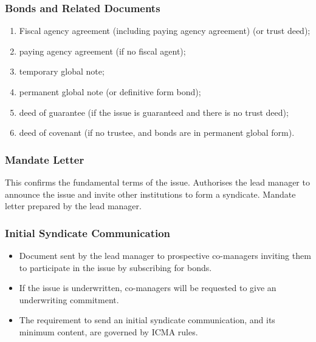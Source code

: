 \documentclass[
]{article}
\providecommand{\tightlist}{%
  \setlength{\itemsep}{0pt}\setlength{\parskip}{0pt}}
\begin{document}
\hypertarget{bonds-and-related-documents}{%
\subsubsection{Bonds and Related
Documents}\label{bonds-and-related-documents}}

\begin{enumerate}
\def\labelenumi{\arabic{enumi}.}
\tightlist
\item
  Fiscal agency agreement (including paying agency agreement) (or trust
  deed);\\
\item
  paying agency agreement (if no fiscal agent);\\
\item
  temporary global note;\\
\item
  permanent global note (or definitive form bond);\\
\item
  deed of guarantee (if the issue is guaranteed and there is no trust
  deed);\\
\item
  deed of covenant (if no trustee, and bonds are in permanent global
  form).
\end{enumerate}

\hypertarget{mandate-letter}{%
\subsubsection{Mandate Letter}\label{mandate-letter}}

This confirms the fundamental terms of the issue. Authorises the lead
manager to announce the issue and invite other institutions to form a
syndicate. Mandate letter prepared by the lead manager.

\hypertarget{initial-syndicate-communication}{%
\subsubsection{Initial Syndicate
Communication}\label{initial-syndicate-communication}}

\begin{itemize}
\tightlist
\item
  Document sent by the lead manager to prospective co-managers inviting
  them to participate in the issue by subscribing for bonds.
\item
  If the issue is underwritten, co-managers will be requested to give an
  underwriting commitment.
\item
  The requirement to send an initial syndicate communication, and its
  minimum content, are governed by ICMA rules.
\end{itemize}
\end{document}

